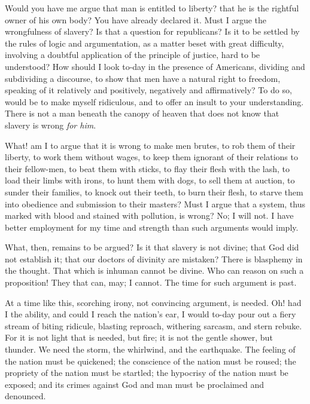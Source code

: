 Would you have me argue that man is entitled to liberty? that he is the
rightful owner of his own body? You have already declared it. Must I
argue the wrongfulness of slavery? Is that a question for republicans?
Is it to be settled by the rules of logic and argumentation, as a matter
beset with great difficulty, involving a doubtful application of the
principle of justice, hard to be understood? How should I look to-day in
the presence of Americans, dividing and subdividing a discourse, to show
that men have a natural right to freedom, speaking of it relatively and
positively, negatively and affirmatively? To do so, would be to make
myself ridiculous, and to offer an insult to your understanding. There
is not a man beneath the canopy of heaven that does not know that
slavery is wrong \emph{for him}.

What! am I to argue that it is wrong to make men brutes, to rob them of
their liberty, to work them without wages, to keep them ignorant of
their relations to their fellow-men, to beat them with sticks, to flay
their flesh with the lash, to load their limbs with irons, to hunt them
with dogs, to sell them at auction, to sunder their families, to knock
out their teeth, to burn their flesh, to starve them into obedience and
submission to their masters? Must I argue that a system, thus marked
with blood and stained with pollution, is wrong? No; I will not. I have
better employment for my time and strength than such arguments would
imply.

What, then, remains to be argued? Is it that slavery is not divine; that
God did not establish it; that our doctors of divinity are mistaken?
There is blasphemy in the thought. That which is inhuman cannot be
divine. Who can reason on such a proposition! They that can, may; I
cannot. The time for such argument is past.

At a time like this, scorching irony, not convincing argument, is
needed. Oh! had I the ability, and could I reach the nation's ear, I
would to-day pour out a fiery stream of biting ridicule, blasting
reproach, withering sarcasm, and stern rebuke. For it is not light that
is needed, but fire; it is not the gentle shower, but thunder. We need
the storm, the whirlwind, and the earthquake. {}The feeling of the
nation must be quickened; the conscience of the nation must be roused;
the propriety of the nation must be startled; the hypocrisy of the
nation must be exposed; and its crimes against God and man must be
proclaimed and denounced.

